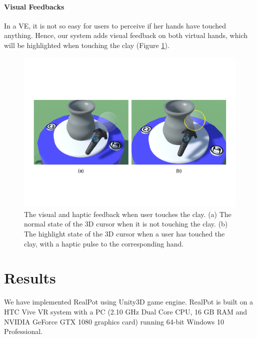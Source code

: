 \documentclass{svjour3}                     %
\begin{document}
\paragraph{Visual Feedbacks}
In a VE, it is not so easy for users to perceive if her hands have touched anything. Hence, our system adds visual feedback on both virtual hands, which will be highlighted when touching the clay (Figure \ref{fig:highlight}).



\begin{figure}
\includegraphics[width=\textwidth]{fig10}
\caption{The visual and haptic feedback when user touches the clay. (a) The normal state of the 3D cursor when it is not touching the clay. (b) The highlight state of the 3D cursor when a user has touched the clay, with a haptic pulse to the corresponding hand.}
\label{fig:highlight}
\end{figure}


\section{Results}
\label{sec:5}

We have implemented RealPot using Unity3D \cite{website:unity} game engine. RealPot is built on a HTC Vive VR system with a PC (2.10 GHz Dual Core CPU, 16 GB RAM and NVIDIA GeForce GTX 1080 graphics card) running 64-bit Windows 10 Professional.
\end{document}
